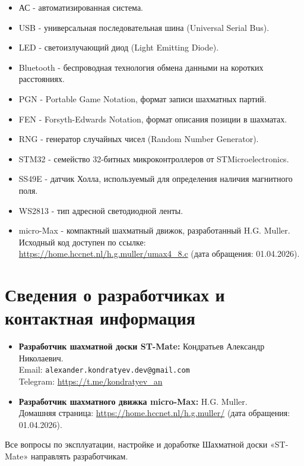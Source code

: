 \documentclass[a4paper,12pt]{article}
\begin{document}
\begin{itemize}
    \item АС - автоматизированная система.
    \item USB - универсальная последовательная шина (Universal Serial Bus).
    \item LED - светоизлучающий диод (Light Emitting Diode).
    \item Bluetooth - беспроводная технология обмена данными на коротких расстояниях.
    \item PGN - Portable Game Notation, формат записи шахматных партий.
    \item FEN - Forsyth-Edwards Notation, формат описания позиции в шахматах.
    \item RNG - генератор случайных чисел (Random Number Generator).
    \item STM32 - семейство 32-битных микроконтроллеров от STMicroelectronics.
    \item SS49E - датчик Холла, используемый для определения наличия магнитного поля.
    \item WS2813 - тип адресной светодиодной ленты.
    \item micro-Max - компактный шахматный движок, разработанный H.G. Muller. Исходный код доступен по ссылке: \url{https://home.hccnet.nl/h.g.muller/umax4_8.c} (дата обращения: 01.04.2026).
\end{itemize}

\section{Сведения о разработчиках и контактная информация}
\label{sec:developers}

\begin{itemize}
    \item \textbf{Разработчик шахматной доски ST-Mate:} Кондратьев Александр Николаевич.\\
          Email: \texttt{alexander.kondratyev.dev@gmail.com}\\
          Telegram: \url{https://t.me/kondratyev_an}
    \item \textbf{Разработчик шахматного движка micro-Max:} H.G. Muller.\\
          Домашняя страница: \url{https://home.hccnet.nl/h.g.muller/} (дата обращения: 01.04.2026).
\end{itemize}
Все вопросы по эксплуатации, настройке и доработке Шахматной доски «ST-Mate» направлять разработчикам.
\end{document}
